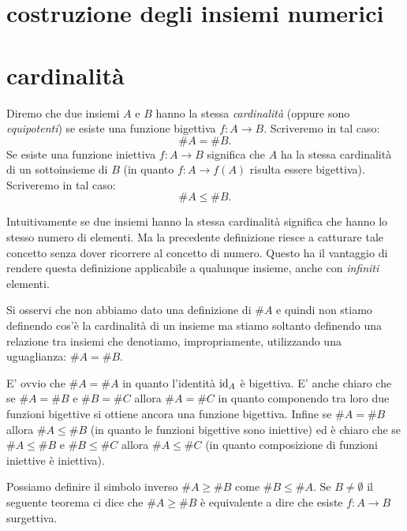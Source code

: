 \section{costruzione degli insiemi numerici}
\label{sec:costruzione}


\section{cardinalità}
\label{sec:cardinali}

\begin{definition}[cardinalità]
  Diremo che due insiemi $A$ e $B$ hanno la stessa \emph{cardinalità}%
%
  (oppure sono \emph{equipotenti}) 
  se esiste una funzione bigettiva $f\colon A \to B$.
  Scriveremo in tal caso:
  \[
    \# A = \# B.  
  \] 
  Se esiste una funzione iniettiva $f\colon A\to B$ significa che 
  $A$ ha la stessa cardinalità di un sottoinsieme di $B$ (in quanto $f\colon A \to f(A)$
  risulta essere bigettiva). Scriveremo in tal caso:
  \[
    \# A \le \#B.
  \]
\end{definition}

Intuitivamente se due insiemi hanno la stessa cardinalità 
significa che hanno lo stesso numero di elementi.
Ma la precedente definizione riesce a catturare tale concetto senza dover 
ricorrere al concetto di numero. 
Questo ha il vantaggio di rendere questa definizione applicabile 
a qualunque insieme, anche con \emph{infiniti} elementi.

Si osservi che non abbiamo dato una definizione di $\#A$ e quindi non stiamo 
definendo cos'è la cardinalità di un insieme ma stiamo soltanto definendo 
una relazione tra insiemi che 
denotiamo, impropriamente, utilizzando una uguaglianza: $\#A = \#B$.

E' ovvio che $\#A = \#A$ in quanto l'identità $\mathrm{id}_A$ è bigettiva.
E' anche chiaro che se $\#A = \#B$ e $\#B = \#C$ allora $\#A = \#C$ in quanto 
componendo tra loro due funzioni bigettive si ottiene ancora una funzione 
bigettiva. 
Infine se $\#A = \#B$ allora $\#A \le \#B$ (in quanto le funzioni bigettive 
sono iniettive) ed è chiaro che se $\#A \le \#B$ e $\#B \le \#C$ allora 
$\#A\le \#C$ (in quanto composizione di funzioni iniettive è iniettiva).

Possiamo definire il simbolo inverso $\#A \ge \#B$ 
come $\#B\le \#A$.
Se $B\neq \emptyset$ 
il seguente teorema ci dice che $\#A \ge \#B$ 
è equivalente a dire che 
esiste $f\colon A \to B$
surgettiva. 
%

